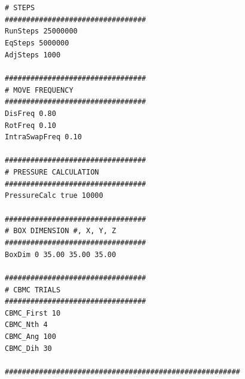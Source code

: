 \texttt{\# STEPS}\\
\texttt{\#\#\#\#\#\#\#\#\#\#\#\#\#\#\#\#\#\#\#\#\#\#\#\#\#\#\#\#\#\#\#\#\#}\\
\texttt{RunSteps          25000000}\\
\texttt{EqSteps		  5000000}\\
\texttt{AdjSteps	 	  1000}\\
\texttt{}\\
\texttt{\#\#\#\#\#\#\#\#\#\#\#\#\#\#\#\#\#\#\#\#\#\#\#\#\#\#\#\#\#\#\#\#\#}\\
\texttt{\# MOVE FREQUENCY}\\
\texttt{\#\#\#\#\#\#\#\#\#\#\#\#\#\#\#\#\#\#\#\#\#\#\#\#\#\#\#\#\#\#\#\#\#}\\
\texttt{DisFreq              		 0.80}\\
\texttt{RotFreq		    	         0.10}\\
\texttt{IntraSwapFreq		         0.10}\\
\texttt{}\\
\texttt{\#\#\#\#\#\#\#\#\#\#\#\#\#\#\#\#\#\#\#\#\#\#\#\#\#\#\#\#\#\#\#\#\#}\\
\texttt{\# PRESSURE CALCULATION}\\ 
\texttt{\#\#\#\#\#\#\#\#\#\#\#\#\#\#\#\#\#\#\#\#\#\#\#\#\#\#\#\#\#\#\#\#\#}\\
\texttt{PressureCalc	true 		10000}\\
\texttt{}\\
\texttt{\#\#\#\#\#\#\#\#\#\#\#\#\#\#\#\#\#\#\#\#\#\#\#\#\#\#\#\#\#\#\#\#\#}\\
\texttt{\# BOX DIMENSION \#, X, Y, Z}\\
\texttt{\#\#\#\#\#\#\#\#\#\#\#\#\#\#\#\#\#\#\#\#\#\#\#\#\#\#\#\#\#\#\#\#\#}\\
\texttt{BoxDim  0    35.00  35.00  35.00}\\
\texttt{}\\
\texttt{\#\#\#\#\#\#\#\#\#\#\#\#\#\#\#\#\#\#\#\#\#\#\#\#\#\#\#\#\#\#\#\#\#}\\
\texttt{\# CBMC TRIALS}\\
\texttt{\#\#\#\#\#\#\#\#\#\#\#\#\#\#\#\#\#\#\#\#\#\#\#\#\#\#\#\#\#\#\#\#\#}\\
\texttt{CBMC\_First   10}\\
\texttt{CBMC\_Nth     4}\\
\texttt{CBMC\_Ang     100}\\
\texttt{CBMC\_Dih     30}\\
\texttt{}\\
\texttt{\#\#\#\#\#\#\#\#\#\#\#\#\#\#\#\#\#\#\#\#\#\#\#\#\#\#\#\#\#\#\#\#\#\#\#\#\#\#\#\#\#\#\#\#\#\#\#\#\#\#\#\#\#\#\#}\\
